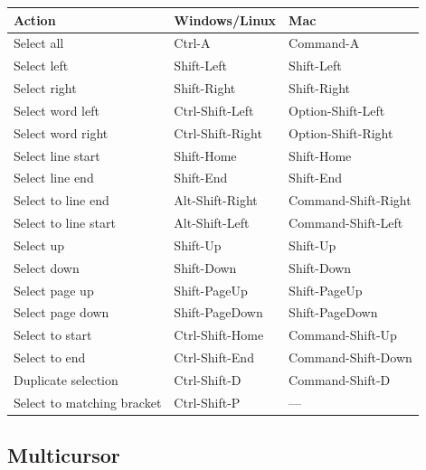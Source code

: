 \documentclass[
]{book}
\begin{document}
\begin{longtable}[]{@{}lll@{}}
\toprule
Action & Windows/Linux & Mac \\
\midrule
\endhead
Select all & Ctrl-A & Command-A \\
Select left & Shift-Left & Shift-Left \\
Select right & Shift-Right & Shift-Right \\
Select word left & Ctrl-Shift-Left & Option-Shift-Left \\
Select word right & Ctrl-Shift-Right & Option-Shift-Right \\
Select line start & Shift-Home & Shift-Home \\
Select line end & Shift-End & Shift-End \\
Select to line end & Alt-Shift-Right & Command-Shift-Right \\
Select to line start & Alt-Shift-Left & Command-Shift-Left \\
Select up & Shift-Up & Shift-Up \\
Select down & Shift-Down & Shift-Down \\
Select page up & Shift-PageUp & Shift-PageUp \\
Select page down & Shift-PageDown & Shift-PageDown \\
Select to start & Ctrl-Shift-Home & Command-Shift-Up \\
Select to end & Ctrl-Shift-End & Command-Shift-Down \\
Duplicate selection & Ctrl-Shift-D & Command-Shift-D \\
Select to matching bracket & Ctrl-Shift-P & --- \\
\bottomrule
\end{longtable}

\hypertarget{multicursor}{%
\subsection{Multicursor}\label{multicursor}}
\end{document}
